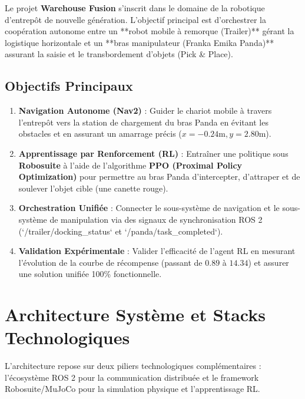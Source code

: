 \documentclass[11pt,a4paper]{article}
\begin{document}
Le projet \textbf{Warehouse Fusion} s'inscrit dans le domaine de la robotique d'entrepôt de nouvelle génération. L'objectif principal est d'orchestrer la coopération autonome entre un **robot mobile à remorque (Trailer)** gérant la logistique horizontale et un **bras manipulateur (Franka Emika Panda)** assurant la saisie et le transbordement d'objets (Pick \& Place).

\subsection{Objectifs Principaux}
\begin{enumerate}
    \item \textbf{Navigation Autonome (Nav2)} : Guider le chariot mobile à travers l'entrepôt vers la station de chargement du bras Panda en évitant les obstacles et en assurant un amarrage précis ($x = -0.24\text{m}, y = 2.80\text{m}$).
    \item \textbf{Apprentissage par Renforcement (RL)} : Entraîner une politique sous \textbf{Robosuite} à l'aide de l'algorithme \textbf{PPO (Proximal Policy Optimization)} pour permettre au bras Panda d'intercepter, d'attraper et de soulever l'objet cible (une canette rouge).
    \item \textbf{Orchestration Unifiée} : Connecter le sous-système de navigation et le sous-système de manipulation via des signaux de synchronisation ROS 2 (`/trailer/docking_status` et `/panda/task_completed`).
    \item \textbf{Validation Expérimentale} : Valider l'efficacité de l'agent RL en mesurant l'évolution de la courbe de récompense (passant de $0.89$ à $14.34$) et assurer une solution unifiée 100\% fonctionnelle.
\end{enumerate}

\section{Architecture Système et Stacks Technologiques}

L'architecture repose sur deux piliers technologiques complémentaires : l'écosystème ROS 2 pour la communication distribuée et le framework Robosuite/MuJoCo pour la simulation physique et l'apprentissage RL.
\end{document}
